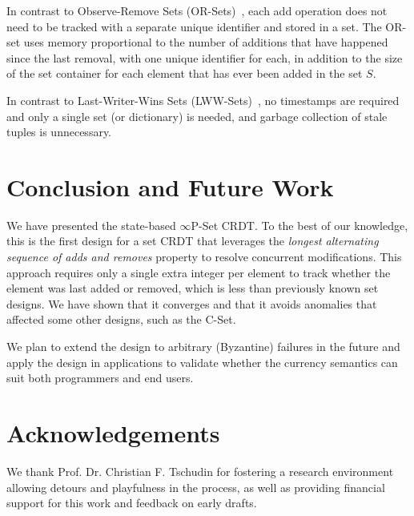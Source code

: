 \documentclass[11pt, oneside]{article}   	%
\begin{document}
In contrast to Observe-Remove Sets (OR-Sets)~\cite{shapiro:inria-00555588}, each add operation does not need to be tracked with a separate unique identifier and stored in a set. The OR-set uses memory proportional to the number of additions that have happened since the last removal, with one unique identifier for each, in addition to the size of the set container for each element that has ever been added in the set $S$.

In contrast to Last-Writer-Wins Sets (LWW-Sets)~\cite{shapiro:inria-00555588}, no timestamps are required and only a single set (or dictionary) is needed, and garbage collection of stale tuples is unnecessary.

%
%
%


\section{Conclusion and Future Work}
\label{sec:conclusion}

We have presented the state-based $\infty$P-Set CRDT. To the best of our knowledge, this is the first design for a set CRDT that leverages the \textit{longest alternating sequence of adds and removes} property to resolve concurrent modifications. This approach requires only a single extra integer per element to track whether the element was last added or removed, which is less than previously known set designs. We have shown that it converges and that it avoids anomalies that affected some other designs, such as the C-Set.

We plan to extend the design to arbitrary (Byzantine) failures in the future and apply the design in applications to validate whether the currency semantics can suit both programmers and end users.

\section{Acknowledgements}
\label{sec:acknowledgements}

We thank Prof. Dr. Christian F. Tschudin for fostering a research environment allowing detours and playfulness in the process, as well as providing financial support for this work and feedback on early drafts. 
\end{document}
